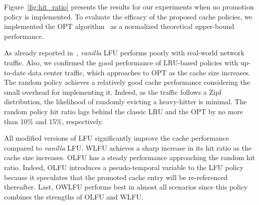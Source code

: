 Figure~\ref{fig:hit_ratio} presents the results for our experiments when no promotion policy is implemented.
To evaluate the efficacy of the proposed cache policies, we implemented the OPT algorithm~\cite{Belady:66} as a normalized theoretical upper-bound performance.


As already reported in~\cite{Kim:09}, \textit{vanilla} LFU performs poorly with real-world network traffic.
Also, we confirmed the good performance of LRU-based policies with up-to-date data center traffic, which approaches to OPT as the cache size increases.
The random policy achieves a relatively good cache performance considering the small overhead for implementing it.
Indeed, as the traffic follows a Zipf distribution, the likelihood of randomly evicting a heavy-hitter is minimal.
The random policy hit ratio lags behind the classic LRU and the OPT by no more than 10\% and 15\%, respectively.

All modified versions of LFU significantly improve the cache performance compared to \textit{vanilla} LFU.
WLFU achieves a sharp increase in its hit ratio as the cache size increases.
OLFU has a steady performance approaching the random hit ratio.
Indeed, OLFU introduces a pseudo-temporal variable to the LFU policy because it speculates that the promoted cache entry will be re-referenced thereafter. 
Last, OWLFU performs best in almost all scenarios since this policy combines the strengths of OLFU and WLFU.

